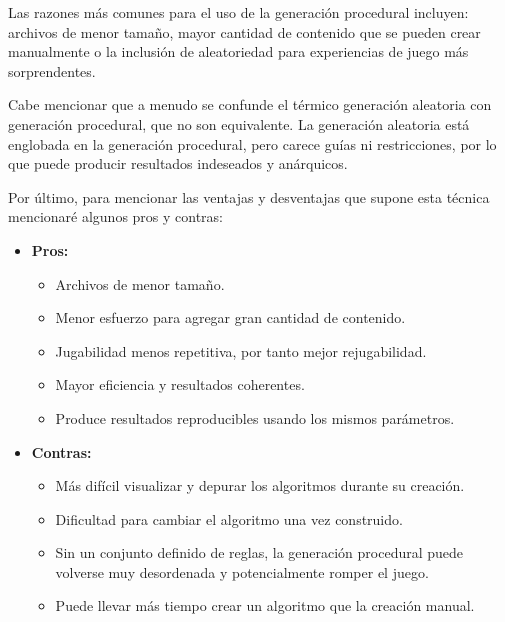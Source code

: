     Las razones más comunes para el uso de la generación procedural incluyen: archivos de menor tamaño, mayor cantidad de contenido que se pueden crear manualmente o la inclusión de aleatoriedad para experiencias de juego más sorprendentes. \cite{generacion-procedimental-wikipedia}

    Cabe mencionar que a menudo se confunde el térmico generación aleatoria con generación procedural, que no son equivalente. La generación aleatoria está englobada en la generación procedural, pero carece guías ni restricciones, por lo que puede producir resultados indeseados y anárquicos. 

    Por último, para mencionar las ventajas y desventajas que supone esta técnica mencionaré algunos pros y contras:

    \begin{itemize}[label=--]
        \item \textbf{Pros:}
        \begin{itemize}[label=$\bullet$]
            \item Archivos de menor tamaño.
            \item Menor esfuerzo para agregar gran cantidad de contenido.
            \item Jugabilidad menos repetitiva, por tanto mejor rejugabilidad.
            \item Mayor eficiencia y resultados coherentes.
            \item Produce resultados reproducibles usando los mismos parámetros.
        \end{itemize}
        \item \textbf{Contras:}
        \begin{itemize}[label=$\bullet$]
            \item Más difícil visualizar y depurar los algoritmos durante su creación.
            \item Dificultad para cambiar el algoritmo una vez construido.
            \item Sin un conjunto definido de reglas, la generación procedural puede volverse muy desordenada y potencialmente romper el juego.
            \item Puede llevar más tiempo crear un algoritmo que la creación manual.
        \end{itemize}
    \end{itemize}


